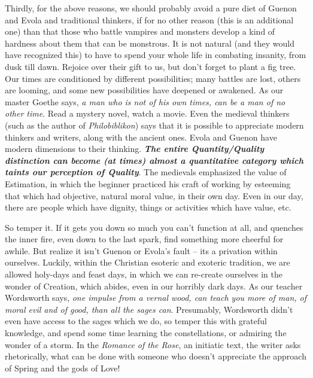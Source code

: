 Thirdly, for the above reasons, we should probably avoid a pure diet of Guenon and Evola and traditional thinkers, if for no other reason (this is an additional one) than that those who battle vampires and monsters develop a kind of hardness about them that can be monstrous. It is not natural (and they would have recognized this) to have to spend your whole life in combating insanity, from dusk till dawn. Rejoice over their gift to us, but don't forget to plant a fig tree. Our times are conditioned by different possibilities; many battles are lost, others are looming, and some new possibilities have deepened or awakened. As our master Goethe says, \emph{a man who is not of his own times, can be a man of no other time}. Read a mystery novel, watch a movie. Even the medieval thinkers (such as the author of \emph{Philobiblikon}) says that it is possible to appreciate modern thinkers and writers, along with the ancient ones. Evola and Guenon have modern dimensions to their thinking. \textbf{\emph{The entire Quantity/Quality distinction can become (at times) almost a quantitative category which taints our perception of Quality}}. The medievals emphasized the value of Estimation, in which the beginner practiced his craft of working by esteeming that which had objective, natural moral value, in their own day. Even in our day, there are people which have dignity, things or activities which have value, etc.

So temper it. If it gets you down so much you can't function at all, and quenches the inner fire, even down to the last spark, find something more cheerful for awhile. But realize it isn't Guenon or Evola's fault -- its a privation within ourselves. Luckily, within the Christian esoteric and exoteric tradition, we are allowed holy-days and feast days, in which we can re-create ourselves in the wonder of Creation, which abides, even in our horribly dark days. As our teacher Wordsworth says, \emph{one impulse from a vernal wood, can teach you more of man, of moral evil and of good, than all the sages can}. Presumably, Wordsworth didn't even have access to the sages which we do, so temper this with grateful knowledge, and spend some time learning the constellations, or admiring the wonder of a storm. In the \emph{Romance of the Rose}, an initiatic text, the writer asks rhetorically, what can be done with someone who doesn't appreciate the approach of Spring and the gods of Love!

